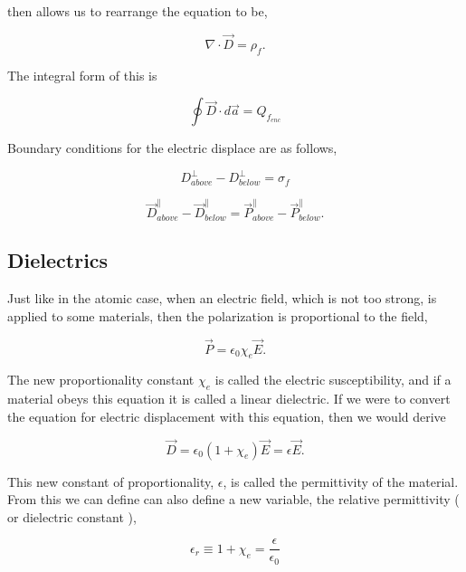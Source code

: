 \documentclass[preprint, review,12pt]{elsarticle}
\begin{document}
then allows us to rearrange the equation to be,

\begin{equation}
    \nabla \cdot \vec{D} = \rho_f.
\end{equation}

The integral form of this is

\begin{equation}
    \oint \vec{D} \cdot d\vec{a}= Q_{f_{enc}}
\end{equation}

Boundary conditions for the electric displace are as follows,

\begin{equation}
    D_{above}^\bot - D_{below}^\bot = \sigma_f
\end{equation}

\begin{equation}
    \vec{D}_{above}^\parallel - \vec{D}_{below}^\parallel = \vec{P}_{above}^\parallel - \vec{P}_{below}^\parallel.
\end{equation}

\subsection{Dielectrics}

Just like in the atomic case, when an electric field, which is not too strong, is applied to some materials, then the polarization is proportional to the field,

\begin{equation}
    \vec{P} = \epsilon_0 \chi_e \vec{E}.
\end{equation}

The new proportionality constant $\chi_e$ is called the electric susceptibility, and if a material obeys this equation it is called a linear dielectric. If we were to convert the equation for electric displacement with this equation, then we would derive 

\begin{equation}
    \vec{D} = \epsilon_0 (1+\chi_e)\vec{E} = \epsilon \vec{E}.
\end{equation}

This new constant of proportionality, $\epsilon$, is called the permittivity of the material. From this we can define can also define a new variable, the relative permittivity ( or dielectric constant ), 

\begin{equation}
    \epsilon_r \equiv 1 + \chi_e = \frac{\epsilon}{\epsilon_0}
\end{equation}
\end{document}
